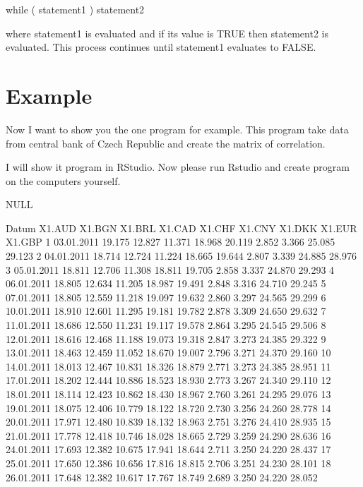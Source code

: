 \documentclass[a4paper,11pt]{scrartcl}
\begin{document}
     while ( statement1 ) statement2
     
where statement1 is evaluated and if its value is TRUE then statement2 is evaluated. This process continues until statement1 evaluates to FALSE.


\section{Example}
\label{sec:Example}
Now I want to show you  the  one program for example.
This program take data from  central bank of Czech Republic  and create the matrix of correlation.

I will show it program in RStudio.
Now please  run Rstudio and  create program on  the   computers yourself.

\begin{Schunk}
\begin{Soutput}
NULL
\end{Soutput}
\begin{Soutput}
         Datum X1.AUD X1.BGN X1.BRL X1.CAD X1.CHF X1.CNY X1.DKK X1.EUR X1.GBP
1   03.01.2011 19.175 12.827 11.371 18.968 20.119  2.852  3.366 25.085 29.123
2   04.01.2011 18.714 12.724 11.224 18.665 19.644  2.807  3.339 24.885 28.976
3   05.01.2011 18.811 12.706 11.308 18.811 19.705  2.858  3.337 24.870 29.293
4   06.01.2011 18.805 12.634 11.205 18.987 19.491  2.848  3.316 24.710 29.245
5   07.01.2011 18.805 12.559 11.218 19.097 19.632  2.860  3.297 24.565 29.299
6   10.01.2011 18.910 12.601 11.295 19.181 19.782  2.878  3.309 24.650 29.632
7   11.01.2011 18.686 12.550 11.231 19.117 19.578  2.864  3.295 24.545 29.506
8   12.01.2011 18.616 12.468 11.188 19.073 19.318  2.847  3.273 24.385 29.322
9   13.01.2011 18.463 12.459 11.052 18.670 19.007  2.796  3.271 24.370 29.160
10  14.01.2011 18.013 12.467 10.831 18.326 18.879  2.771  3.273 24.385 28.951
11  17.01.2011 18.202 12.444 10.886 18.523 18.930  2.773  3.267 24.340 29.110
12  18.01.2011 18.114 12.423 10.862 18.430 18.967  2.760  3.261 24.295 29.076
13  19.01.2011 18.075 12.406 10.779 18.122 18.720  2.730  3.256 24.260 28.778
14  20.01.2011 17.971 12.480 10.839 18.132 18.963  2.751  3.276 24.410 28.935
15  21.01.2011 17.778 12.418 10.746 18.028 18.665  2.729  3.259 24.290 28.636
16  24.01.2011 17.693 12.382 10.675 17.941 18.644  2.711  3.250 24.220 28.437
17  25.01.2011 17.650 12.386 10.656 17.816 18.815  2.706  3.251 24.230 28.101
18  26.01.2011 17.648 12.382 10.617 17.767 18.749  2.689  3.250 24.220 28.052

\end{Soutput}
\end{Schunk}
\end{document}
